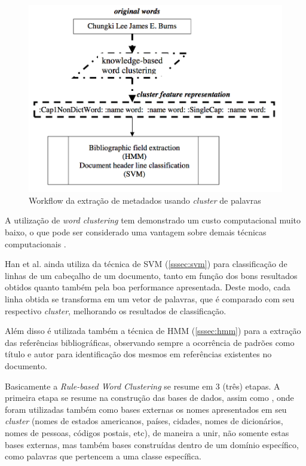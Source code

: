 \begin{figure}
    \centering
    \caption{Workflow da extração de metadados usando \textit{cluster} de palavras}
    \label{fig:workflow-rule-based}
    \includegraphics[width=0.7\linewidth]{./assets/images/workflow-rule-based}
\end{figure}

\begin{textnew}
A utilização de \textit{word clustering} tem demonstrado um custo computacional muito baixo, o que pode ser considerado uma vantagem sobre demais técnicas computacionais \cite{Han-Giles-WC}.
\end{textnew}

\begin{textedited}

Han et al. ainda utiliza da técnica  de SVM (\autoref{sssec:svm}) para classificação de linhas de um cabeçalho de um documento, tanto em função dos bons resultados obtidos quanto também pela boa performance apresentada. Deste modo, cada linha obtida se transforma em um vetor de palavras, que é comparado com seu respectivo \textit{cluster}, melhorando os resultados de classificação.

\end{textedited}

Além disso é utilizada também a técnica de HMM (\autoref{sssec:hmm}) para a extração das referências bibliográficas, observando sempre a ocorrência de padrões como título e autor para identificação dos mesmos em referências existentes no documento.

Basicamente a \textit{Rule-based Word Clustering} se resume em 3 (três) etapas. A primeira etapa se resume na construção das bases de dados, assim como \cite{Han-SVM}, onde foram utilizadas também como bases externas os nomes apresentados em seu \textit{cluster} (nomes de estados americanos, países, cidades, nomes de dicionários, nomes de pessoas, códigos postais, etc), de maneira a unir, não somente estas bases externas, mas também bases construídas dentro de um domínio específico, como palavras que pertencem a uma classe específica.

